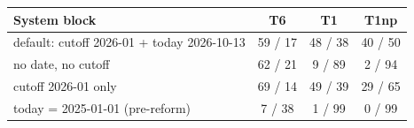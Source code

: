 \begin{tabular}{@{}l ccc@{}}
\toprule
System block & T6 & T1 & T1np \\
\midrule
default: cutoff 2026-01 + today 2026-10-13 & 59 / 17 & 48 / 38 & 40 / 50 \\
no date, no cutoff & 62 / 21 & 9 / 89 & 2 / 94 \\
cutoff 2026-01 only & 69 / 14 & 49 / 39 & 29 / 65 \\
today = 2025-01-01 (pre-reform) & 7 / 38 & 1 / 99 & 0 / 99 \\
\bottomrule
\end{tabular}
